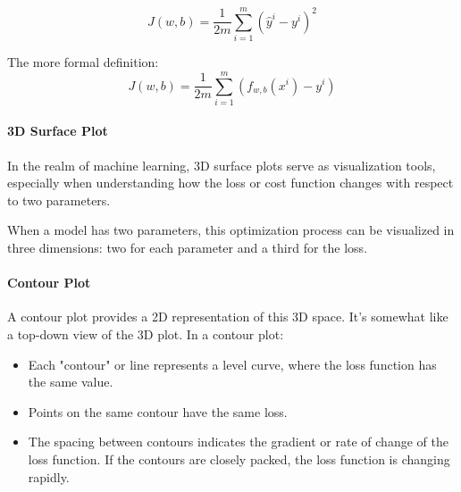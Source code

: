 \documentclass[a4paper]{article}
\begin{document}
    \[J(w,b) = \frac{1}{2m} \sum_{i=1}^{m}(\hat{y}^i - y^i)^2\]
    

    The more formal definition: 
    \[J(w,b) = \frac{1}{2m} \sum_{i=1}^{m}\left( f_{w,b}(x^i) - y^i \right)\]

    \paragraph*{3D Surface Plot} In the realm of machine learning, 3D surface plots serve as visualization tools, especially when understanding how the loss or cost function changes with respect to two parameters.

    When a model has two parameters, this optimization process can be visualized in three dimensions: two for each parameter and a third for the loss.


    \begin{center}
    \end{center}


    \paragraph*{Contour Plot} A contour plot provides a 2D representation of this 3D space. It's somewhat like a top-down view of the 3D plot. In a contour plot:

    \begin{itemize}
        \item Each "contour" or line represents a level curve, where the loss function has the same value.
        \item Points on the same contour have the same loss.
        \item The spacing between contours indicates the gradient or rate of change of the loss function. If the contours are closely packed, the loss function is changing rapidly.
    \end{itemize}

        
\end{document}

